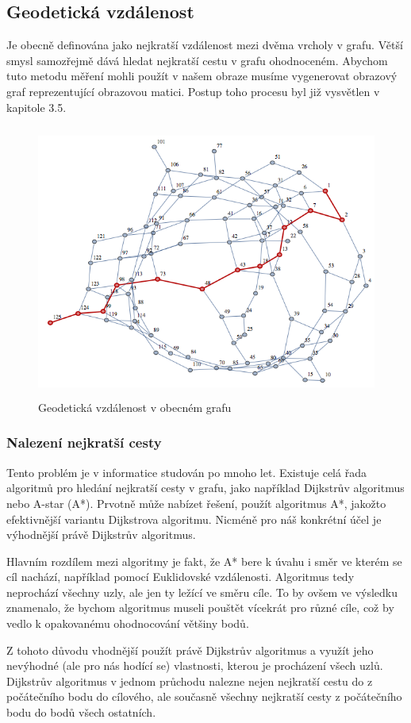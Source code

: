 \documentclass[czech, master, public, dept460, male, cpdeclaration, oneside]{diploma}
\begin{document}
\subsection{Geodetická vzdálenost}
Je obecně definována jako nejkratší vzdálenost mezi dvěma vrcholy v grafu. Větší smysl samozřejmě dává hledat nejkratší cestu v grafu ohodnoceném. Abychom tuto metodu měření mohli použít v našem obraze musíme vygenerovat obrazový graf reprezentující obrazovou matici. Postup toho procesu byl již vysvětlen v kapitole 3.5. \cite{Bouttier}
\begin{figure}[H]
	\vspace*{+3.0mm}
	\centering
	\includegraphics[height=9cm]{Figures/explanatory/geodesicDistanceBigGraph.png}
	\caption{Geodetická vzdálenost v obecném grafu}
\end{figure}


\subsubsection{Nalezení nejkratší cesty}
Tento problém je v informatice studován po mnoho let. Existuje celá řada algoritmů pro hledání nejkratší cesty v grafu, jako například Dijkstrův algoritmus nebo A-star (A*). Prvotně může nabízet řešení, použít algoritmus A*, jakožto efektivnější variantu Dijkstrova algoritmu. Nicméně pro náš konkrétní účel je výhodnější právě Dijkstrův algoritmus.\par
Hlavním rozdílem mezi algoritmy je fakt, že A* bere k úvahu i směr ve kterém se cíl nachází, například pomocí Euklidovské vzdálenosti. Algoritmus tedy neprochází všechny uzly, ale jen ty ležící ve směru cíle.  To by ovšem ve výsledku znamenalo, že bychom algoritmus museli pouštět vícekrát pro různé cíle, což by vedlo k opakovanému ohodnocování většiny bodů.\par
Z tohoto důvodu vhodnější použít právě Dijkstrův algoritmus a využít jeho nevýhodné (ale pro nás hodící se) vlastnosti, kterou je procházení všech uzlů. Dijkstrův algoritmus v jednom průchodu nalezne nejen nejkratší cestu do z počátečního bodu do cílového, ale současně všechny nejkratší cesty z počátečního bodu do bodů všech ostatních.\cite{Algfoor}\par
\end{document}
